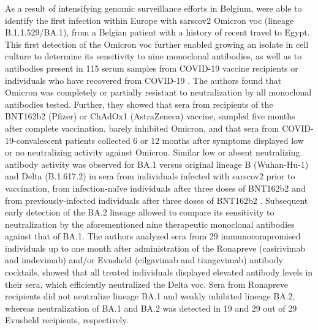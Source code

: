 As a result of intensifying genomic surveillance efforts in Belgium, \citet{vanmechelen2022identification} were able to identify the first infection within Europe with \gls{sarscov2} Omicron \gls{voc} (lineage B.1.1.529/BA.1), from a Belgian patient with a history of recent travel to Egypt.
This first detection of the Omicron \gls{voc} further enabled growing an isolate in cell culture to determine its sensitivity to nine monoclonal antibodies, as well as to antibodies present in 115 serum samples from COVID-19 vaccine recipients or individuals who have recovered from COVID-19 \citep{planas2022considerable}.
The authors found that Omicron was completely or partially resistant to neutralization by all monoclonal antibodies tested.
Further, they showed that sera from recipients of the BNT162b2 (Pfizer) or ChAdOx1 (AstraZeneca) vaccine, sampled five months after complete vaccination, barely inhibited Omicron, and that sera from COVID-19-convalescent patients collected 6 or 12 months after symptoms displayed low or no neutralizing activity against Omicron.
Similar low or absent neutralizing antibody activity was observed for BA.1 versus original lineage B (Wuhan-Hu-1) and Delta (B.1.617.2) in sera from individuals infected with \gls{sarscov2} prior to vaccination, from infection-na\"{i}ve individuals after three doses of BNT162b2 and from previously-infected individuals after three doses of BNT162b2 \citep{arin2022three}.
Subsequent early detection of the BA.2 lineage allowed \citet{bruel2022serum} to compare its sensitivity to neutralization by the aforementioned nine therapeutic monoclonal antibodies against that of BA.1.
The authors analyzed sera from 29 immunocompromised individuals up to one month after administration of the Ronapreve (casirivimab and imdevimab) and/or Evusheld (cilgavimab and tixagevimab) antibody cocktails.
\citet{bruel2022serum} showed that all treated individuals displayed elevated antibody levels in their sera, which efficiently neutralized the Delta \gls{voc}.
Sera from Ronapreve recipients did not neutralize lineage BA.1 and weakly inhibited lineage BA.2, whereas neutralization of BA.1 and BA.2 was detected in 19 and 29 out of 29 Evusheld recipients, respectively.

